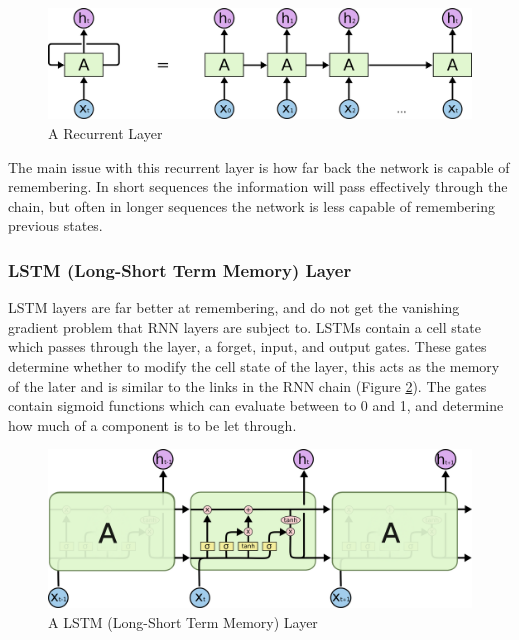 \documentclass[11pt,twoside]{report}
\begin{document}
\noindent \begin{figure}[h!]
	\includegraphics[width = 1.0\hsize]{./figures/RNN-unrolled.png}
	\caption{A Recurrent Layer \cite{Christopher_Olah_Blog}}
	\label{rnn_unrolled}
\end{figure}

The main issue with this recurrent layer is how far back the network is capable of remembering. In short sequences the information will pass effectively through the chain, but often in longer sequences the network is less capable of remembering previous states. 

\subsubsection{LSTM (Long-Short Term Memory) Layer} 
LSTM layers are far better at remembering, and do not get the vanishing gradient problem that RNN layers are subject to. LSTMs contain a cell state which passes through the layer, a forget, input, and output gates. These gates determine whether to modify the cell state of the layer, this acts as the memory of the later and is similar to the links in the RNN chain (Figure \ref{rnn_unrolled}). The gates contain sigmoid functions which can evaluate between to 0 and 1, and determine how much of a component is to be let through.

\noindent \begin{figure}[h!]
	\includegraphics[width = 1.0\hsize]{./figures/LSTM3-chain.png}
	\caption{A LSTM (Long-Short Term Memory) Layer \cite{Christopher_Olah_Blog}}
	\label{rnn_unrolled}
\end{figure}
\end{document}
